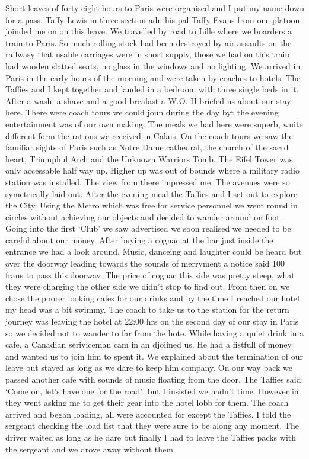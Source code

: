 Short leaves of forty-eight hours to Paris were organised and I put my
name down for a pass. Taffy Lewis in three section adn his pal Taffy
Evans from one platoon joinded me on on this leave. We travelled by
road to Lille where we boarders a train to Paris. So much rolling
stock had been destroyed by air assaults on the railwasy that usable
carriages were in short supply, those we had on this train had wooden
slatted seats, no glass in the windows and no lighting. We arrived in
Paris in the early hours of the morning and were taken by coaches to
hotels. The Taffies and I kept together and landed in a bedroom with
three single beds in it. After a wash, a shave and a good breafast a
W.O. II briefed us about our stay here. There were coach tours we
could joun during the day byt the evening entertainment was of our own
making. The meals we had here were superb, wuite different form the
rations we received in Calais. On the coach tours we saw the familiar
sights of Paris such as Notre Dame cathedral, the church of the sacrd
heart, Triumphul Arch and the Unknown Warriors Tomb. The Eifel Tower
was only accessable half way up. Higher up was out of bounds where a
military radio station was installed. The view from there impressed
me. The avenues were so symetrically laid out. After the evening meal
the Taffies and I set out to explore the City. Using the Metro which
was free for service personnel we went round in circles without
achieving our objects and decided to wander around on foot. Going into
the first `Club' we saw advertised we soon realised we needed to be
careful about our money. After buying a cognac at the bar just inside
the entrance we had a look around. Music, danceing and laughter could
be heard but over the doorway leading towards the sounds of merryment
a notice said 100 frans to pass this doorway. The price of cognac this
side was pretty steep, what they were charging the other side we
didn't stop to find out. From then on we chose the poorer looking
cafes for our drinks and by the time I reached our hotel my head was a
bit swimmy. The coach to take us to the station for the return journey
was leaving the hotel at 22:00 hrs on the second day of our stay in
Paris so we decided not to wander to far from the hote. While having a
quiet drink in a cafe, a Canadian seriviceman cam in an djoiined
us. He had a fistfull of money and wanted us to join him to spent
it. We explained about the termination of our leave but stayed as long
as we dare to keep him company. On our way back we passed another cafe
with sounds of music floating from the door. The Taffies said: `Come
on, let's have one for the road', but I insisted we hadn't
time. However in they went asking me to get their gear into the hotel
lobb for them. The coach arrived and began loading, all were accounted
for except the Taffies. I told the sergeant checking the load list
that they were sure to be along any moment. The driver waited as long
as he dare but finally I had to leave the Taffies packs with the
sergeant and we drove away without them.

